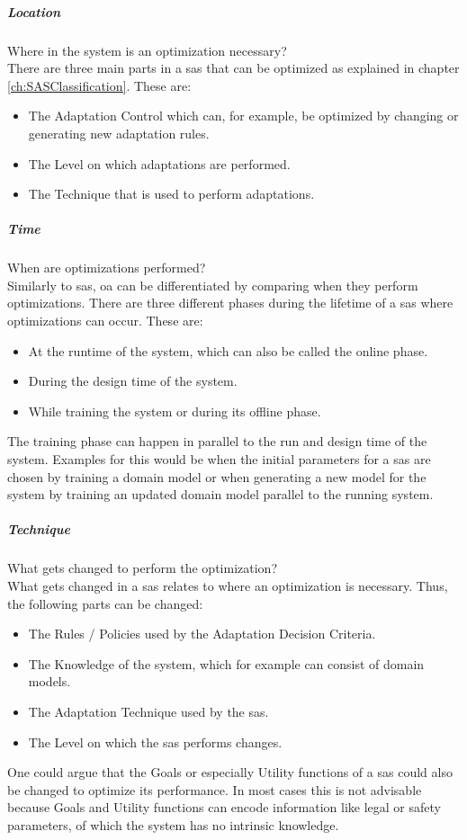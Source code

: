 \subparagraph*{Location}
Where in the system is an optimization necessary? \\
There are three main parts in a \acrshort{sas} that can be optimized as explained in chapter \ref{ch:SASClassification}.
These are:
\begin{itemize}[nosep]
    \item The Adaptation Control which can, for example, be optimized by changing or generating new adaptation rules.
    \item The Level on which adaptations are performed.
    \item The Technique that is used to perform adaptations.
\end{itemize}

\subparagraph*{Time}
When are optimizations performed? \\
Similarly to \acrshort{sas}, \acrshort{oa} can be differentiated by comparing when they perform optimizations.
There are three different phases during the lifetime of a \acrshort{sas} where optimizations can occur.
These are:
\begin{itemize}[nosep]
    \item At the runtime of the system, which can also be called the online phase.
    \item During the design time of the system.
    \item While training the system or during its offline phase.
\end{itemize}
The training phase can happen in parallel to the run and design time of the system.
Examples for this would be when the initial parameters for a \acrshort{sas} are chosen by training a domain model
or when generating a new model for the system by training an updated domain model parallel to the running system.

\subparagraph*{Technique}
What gets changed to perform the optimization? \\
What gets changed in a \acrshort{sas} relates to where an optimization is necessary.
Thus, the following parts can be changed:
\begin{itemize}[nosep]
    \item The Rules / Policies used by the Adaptation Decision Criteria.
    \item The Knowledge of the system, which for example can consist of domain models.
    \item The Adaptation Technique used by the \acrshort{sas}.
    \item The Level on which the \acrshort{sas} performs changes.
\end{itemize}
One could argue that the Goals or especially Utility functions of a \acrshort{sas} could also be changed to optimize its performance.
In most cases this is not advisable because Goals and Utility functions can encode information
like legal or safety parameters, of which the system has no intrinsic knowledge.

